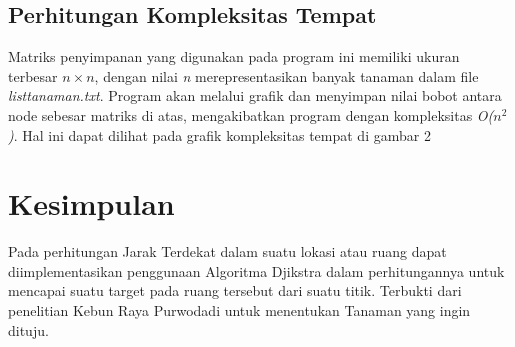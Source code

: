 \documentclass[conference]{IEEEtran}
\begin{document}
\subsection{Perhitungan Kompleksitas Tempat}
Matriks penyimpanan yang digunakan pada program ini memiliki ukuran terbesar $n \times n$, dengan nilai \textit{n} merepresentasikan banyak tanaman dalam ﬁle \textit{listtanaman.txt}. Program akan melalui graﬁk dan menyimpan nilai bobot antara node sebesar matriks di atas, mengakibatkan program dengan kompleksitas \textit{O($n^2$)}. Hal ini dapat dilihat pada graﬁk kompleksitas tempat di gambar 2

\section{Kesimpulan}
Pada perhitungan Jarak Terdekat dalam suatu lokasi atau ruang dapat diimplementasikan penggunaan Algoritma Djikstra dalam perhitungannya untuk mencapai suatu target pada ruang tersebut dari suatu titik. Terbukti dari penelitian Kebun Raya Purwodadi untuk menentukan Tanaman yang ingin dituju.



\end{document}
